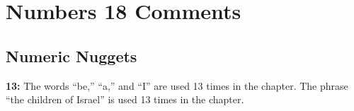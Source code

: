 \section{Numbers 18 Comments}

\subsection{Numeric Nuggets}
\textbf{13: } The words ``be,'' ``a,'' and ``I'' are used 13 times in the chapter. The phrase ``the children of Israel'' is used 13 times in the chapter.